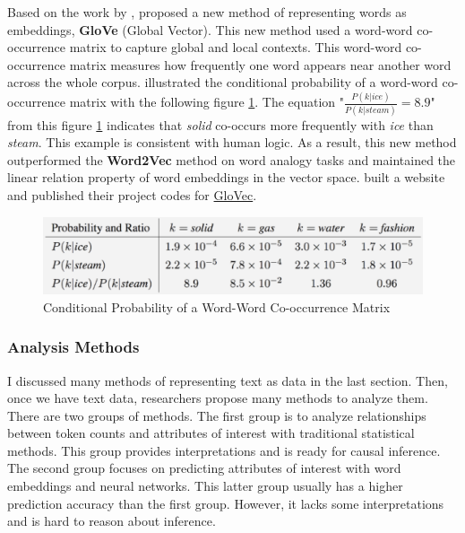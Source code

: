 \documentclass[aoas]{imsart}
\numberwithin{equation}{section}
\theoremstyle{plain}
\theoremstyle{remark}
\begin{document}
Based on the work by \cite{DBLP:journals/corr/MikolovSCCD13}, \cite{pennington-etal-2014-glove} proposed a new method of representing words as embeddings, \textbf{GloVe} (Global Vector). This new method used a word-word co-occurrence matrix to capture global and local contexts. This word-word co-occurrence matrix measures how frequently one word appears near another word across the whole corpus. \cite{pennington-etal-2014-glove} illustrated the conditional probability of a word-word co-occurrence matrix with the following figure \ref{Fig3: co}. The equation "$\frac{P(k|ice)}{P(k|steam)} = 8.9$" from this figure \ref{Fig3: co} indicates that \textit{solid} co-occurs more frequently with \textit{ice} than \textit{steam}. This example is consistent with human logic. As a result, this new method outperformed the \textbf{Word2Vec} method on word analogy tasks and maintained the linear relation property of word embeddings in the vector space. \cite{pennington-etal-2014-glove} built a website and published their project codes for \href{https://nlp.stanford.edu/projects/glove/}{GloVec}.
\begin{figure}[ht]
\includegraphics[scale=0.4]{img/co.png}
\caption{Conditional Probability of a Word-Word Co-occurrence Matrix}
\label{Fig3: co}
\end{figure}

\subsubsection{Analysis Methods}
I discussed many methods of representing text as data in the last section. Then, once we have text data, researchers propose many methods to analyze them. There are two groups of methods. The first group is to analyze relationships between token counts and attributes of interest with traditional statistical methods. This group provides interpretations and is ready for causal inference. The second group focuses on predicting attributes of interest with word embeddings and neural networks. This latter group usually has a higher prediction accuracy than the first group. However, it lacks some interpretations and is hard to reason about inference.
\end{document}
